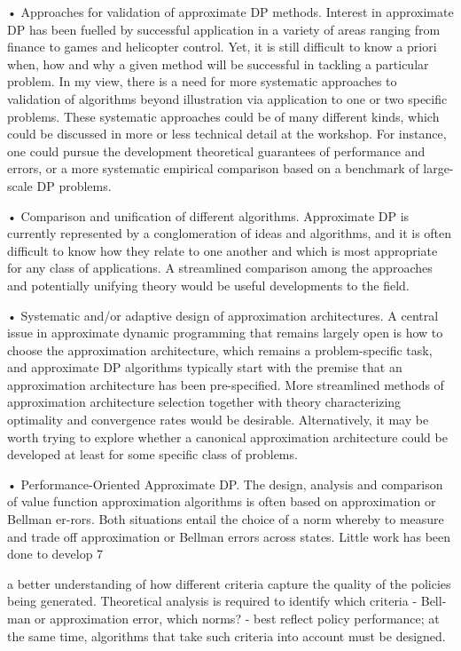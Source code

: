 \documentclass[11pt]{article}
\begin{document}
• Approaches for validation of approximate DP methods. Interest in approximate DP has been fuelled by successful application in a variety of areas ranging from finance to games and helicopter control. Yet, it is still difficult to know a priori when, how and why a given method will be successful in tackling a particular problem. In my view, there is a need for more systematic approaches to validation of algorithms beyond illustration via application to one or two specific problems. These systematic approaches could be of many different kinds, which could be discussed in more or less technical detail at the workshop. For instance, one could pursue the development theoretical guarantees of performance and errors, or a more systematic empirical comparison based on a benchmark of large-scale DP problems.

• Comparison and unification of different algorithms. Approximate DP is currently represented by a conglomeration of ideas and algorithms, and it is often difficult to know how they relate to one another and which is most appropriate for any class of applications. A streamlined comparison among the approaches and potentially unifying theory would be useful developments to the field.

• Systematic and/or adaptive design of approximation architectures. A central issue in approximate dynamic programming that remains largely open is how to choose the approximation architecture, which remains a problem-specific task, and approximate DP algorithms typically start with the premise that an approximation architecture has been pre-specified. More streamlined methods of approximation architecture selection together with theory characterizing optimality and convergence rates would be desirable. Alternatively, it may be worth trying to explore whether a canonical approximation architecture could be developed at least for some specific class of problems.

• Performance-Oriented Approximate DP. The design, analysis and comparison of value function approximation algorithms is often based on approximation or Bellman er-rors. Both situations entail the choice of a norm whereby to measure and trade off approximation or Bellman errors across states. Little work has been done to develop 7

a better understanding of how different criteria capture the quality of the policies being generated. Theoretical analysis is required to identify which criteria - Bell-man or approximation error, which norms? - best reflect policy performance; at the same time, algorithms that take such criteria into account must be designed.
\end{document}
